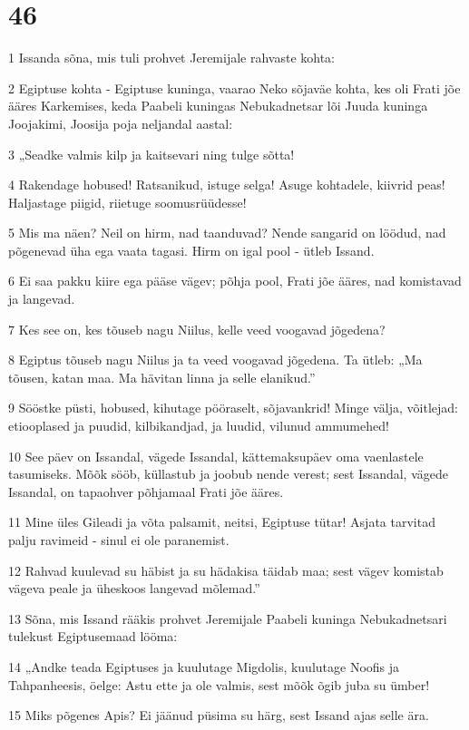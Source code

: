 \chapter{46}

\par 1 Issanda sõna, mis tuli prohvet Jeremijale rahvaste kohta:
\par 2 Egiptuse kohta - Egiptuse kuninga, vaarao Neko sõjaväe kohta, kes oli Frati jõe ääres Karkemises, keda Paabeli kuningas Nebukadnetsar lõi Juuda kuninga Joojakimi, Joosija poja neljandal aastal:
\par 3 „Seadke valmis kilp ja kaitsevari ning tulge sõtta!
\par 4 Rakendage hobused! Ratsanikud, istuge selga! Asuge kohtadele, kiivrid peas! Haljastage piigid, riietuge soomusrüüdesse!
\par 5 Mis ma näen? Neil on hirm, nad taanduvad? Nende sangarid on löödud, nad põgenevad üha ega vaata tagasi. Hirm on igal pool - ütleb Issand.
\par 6 Ei saa pakku kiire ega pääse vägev; põhja pool, Frati jõe ääres, nad komistavad ja langevad.
\par 7 Kes see on, kes tõuseb nagu Niilus, kelle veed voogavad jõgedena?
\par 8 Egiptus tõuseb nagu Niilus ja ta veed voogavad jõgedena. Ta ütleb: „Ma tõusen, katan maa. Ma hävitan linna ja selle elanikud.”
\par 9 Sööstke püsti, hobused, kihutage pööraselt, sõjavankrid! Minge välja, võitlejad: etiooplased ja puudid, kilbikandjad, ja luudid, vilunud ammumehed!
\par 10 See päev on Issandal, vägede Issandal, kättemaksupäev oma vaenlastele tasumiseks. Mõõk sööb, küllastub ja joobub nende verest; sest Issandal, vägede Issandal, on tapaohver põhjamaal Frati jõe ääres.
\par 11 Mine üles Gileadi ja võta palsamit, neitsi, Egiptuse tütar! Asjata tarvitad palju ravimeid - sinul ei ole paranemist.
\par 12 Rahvad kuulevad su häbist ja su hädakisa täidab maa; sest vägev komistab vägeva peale ja üheskoos langevad mõlemad.”
\par 13 Sõna, mis Issand rääkis prohvet Jeremijale Paabeli kuninga Nebukadnetsari tulekust Egiptusemaad lööma:
\par 14 „Andke teada Egiptuses ja kuulutage Migdolis, kuulutage Noofis ja Tahpanheesis, öelge: Astu ette ja ole valmis, sest mõõk õgib juba su ümber!
\par 15 Miks põgenes Apis? Ei jäänud püsima su härg, sest Issand ajas selle ära.

